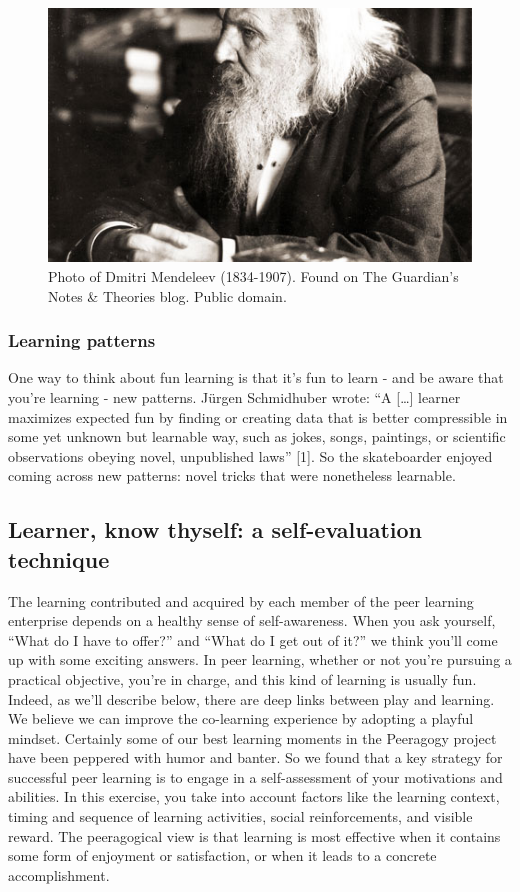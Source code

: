 \begin{figure}
\begin{center}
\includegraphics[width=.8\textwidth]{../pictures/mendeleev.jpg}
\end{center}
\caption*{Photo of Dmitri Mendeleev (1834-1907). Found on The Guardian's Notes \&
Theories blog. Public domain.}
\end{figure}

\subsubsection{Learning patterns}

One way to think about fun learning is that it's fun to learn - and be
aware that you're learning - new patterns. Jürgen Schmidhuber wrote: ``A
{[}\ldots{}{]} learner maximizes expected fun by finding or creating
data that is better compressible in some yet unknown but learnable way,
such as jokes, songs, paintings, or scientific observations obeying
novel, unpublished laws'' {[}1{]}. So the skateboarder enjoyed coming
across new patterns: novel tricks that were nonetheless learnable.

\subsection{Learner, know thyself: a self-evaluation technique}

The learning contributed and acquired by each member of the peer
learning enterprise depends on a healthy sense of self-awareness. When
you ask yourself, ``What do I have to offer?'' and ``What do I get out
of it?'' we think you'll come up with some exciting answers. In peer
learning, whether or not you're pursuing a practical objective, you're
in charge, and this kind of learning is usually fun. Indeed, as we'll
describe below, there are deep links between play and learning. We
believe we can improve the co-learning experience by adopting a playful
mindset. Certainly some of our best learning moments in the Peeragogy
project have been peppered with humor and banter. So we found that a key
strategy for successful peer learning is to engage in a self-assessment
of your motivations and abilities. In this exercise, you take into
account factors like the learning context, timing and sequence of
learning activities, social reinforcements, and visible reward. The
peeragogical view is that learning is most effective when it contains
some form of enjoyment or satisfaction, or when it leads to a concrete
accomplishment.

